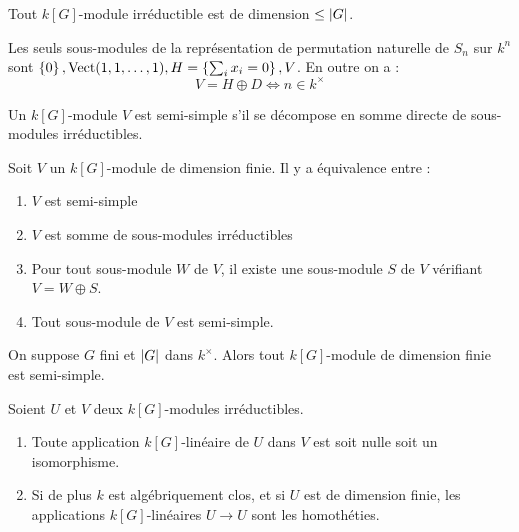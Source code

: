\documentclass{cours}
\begin{document}
\begin{proposition}
    Tout $k[G]$-module irréductible est de dimension $\leq\left|G\right|$.
\end{proposition}

\begin{proposition}
    Les seuls sous-modules de la représentation de permutation naturelle de $S_{n}$ sur $k^{n}$ sont $\left\{0\right\}, \operatorname{Vect}(1, 1,\ldots, 1), H = \left\{\sum_{i} x_{i} = 0\right\}, V$. En outre on a :
    \[
        V = H \oplus D \Longleftrightarrow n \in k^{\times}
    \]
\end{proposition}

\begin{definition}
    Un $k[G]$-module $V$ est semi-simple s'il se décompose en somme directe de sous-modules irréductibles.
\end{definition}

\begin{proposition}
    Soit $V$ un $k[G]$-module de dimension finie. Il y a équivalence entre :
    \begin{enumerate}
        \item $V$ est semi-simple
        \item $V$ est somme de sous-modules irréductibles
        \item Pour tout sous-module $W$ de $V$, il existe une sous-module $S$ de $V$ vérifiant $V = W \oplus S$.
        \item Tout sous-module de $V$ est semi-simple.
    \end{enumerate}
\end{proposition}

\begin{theorem}
    On suppose $G$ fini et $\left|G\right|$ dans $k^{\times}$. Alors tout $k[G]$-module de dimension finie est semi-simple.
\end{theorem}

\begin{lemma}
    Soient $U$ et $V$ deux $k[G]$-modules irréductibles.
    \begin{enumerate}
        \item Toute application $k[G]$-linéaire de $U$ dans $V$ est soit nulle soit un isomorphisme.
        \item Si de plus $k$ est algébriquement clos, et si $U$ est de dimension finie, les applications $k[G]$-linéaires $U \rightarrow U$ sont les homothéties.
    \end{enumerate}
\end{lemma}
\end{document}
